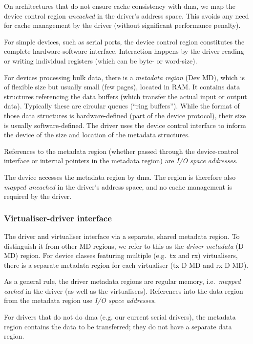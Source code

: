 \documentclass[a4paper,12pt]{report}
\begin{document}
On architectures that do not ensure cache consistency with \gls{dma},
we map the device control region \emph{uncached}
in the driver's address space. This avoids any need for cache management
by the driver (without significant performance penalty).

For simple devices, such as serial ports, the device control region constitutes
the complete hardware-software interface. Interaction happens by the
driver reading or writing individual registers (which can be byte- or
word-size).

For devices processing bulk data, there is a \emph{metadata region}
(Dev MD), which is of flexible size but usually small (few pages), located in
RAM. It contains data structures referencing the data buffers (which
transfer the actual input or output data). Typically these are
circular queues (``ring buffers''). While the format of those data
structures is hardware-defined (part of the device protocol), their size
is usually software-defined. The driver uses the device control interface to
inform the device of the size and location of the metadata
structures.

References to the metadata region (whether passed through the
device-control interface or internal pointers in the metadata region)
are \emph{I/O space addresses}.

The device accesses the metadata region by \gls{dma}. The region is
therefore also \emph{mapped uncached} in the driver's address space,
and no cache management is required by the driver.

\subsubsection{Virtualiser-driver interface}

The driver and virtualiser interface via a separate, shared
metadata region. To distinguish it from other MD regions, we
refer to this as the \emph{driver metadata} (D MD) region.
For device classes featuring multiple
(e.g.\ \gls{tx} and \gls{rx}) virtualisers, there is a separate metadata region
for each virtualiser (\gls{tx} D MD and \gls{rx} D MD).

As a general rule, the driver metadata regions are regular memory, i.e.\
\emph{mapped cached} in the driver (as well as the virtualisers). References
into the data region from the metadata region use \emph{I/O space addresses}.

For drivers that do not do \gls{dma} (e.g. our current serial drivers), the
metadata region contains the data to be transferred; they do not have
a separate data region.
\end{document}
